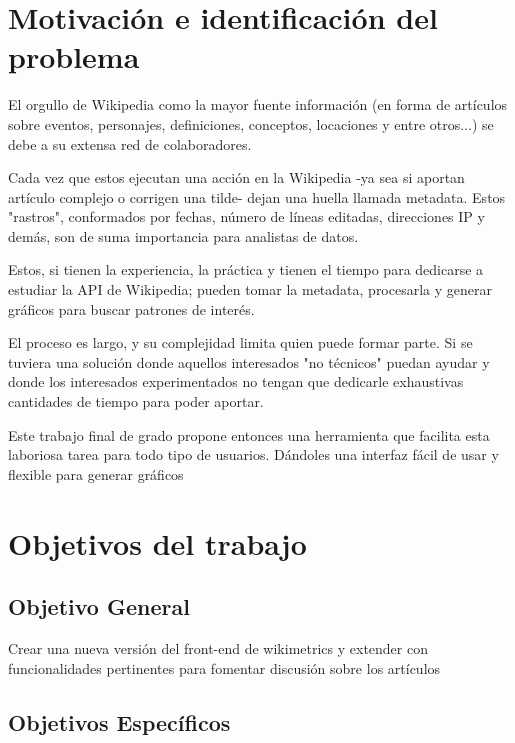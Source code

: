 

\section{Motivación e identificación del problema}

El orgullo de Wikipedia como la mayor fuente información (en forma de artículos sobre eventos, personajes, definiciones, conceptos, locaciones y entre otros...) se debe a su extensa red de colaboradores.

Cada vez que estos ejecutan una acción en la Wikipedia -ya sea si aportan artículo complejo o corrigen una tilde- dejan una huella llamada metadata. Estos "rastros", conformados por fechas, número de líneas editadas, direcciones IP y demás, son de suma importancia para analistas de datos.

Estos, si tienen la experiencia, la práctica y tienen el tiempo para dedicarse a estudiar la API de Wikipedia; pueden tomar la metadata, procesarla y generar gráficos para buscar patrones de interés. 

El proceso es largo, y su complejidad limita quien puede formar parte. Si se tuviera una solución donde aquellos interesados "no técnicos" puedan ayudar y donde los interesados experimentados no tengan que dedicarle exhaustivas cantidades de tiempo para poder aportar.

Este trabajo final de grado propone entonces una herramienta que facilita esta laboriosa tarea para todo tipo de usuarios. 
Dándoles una interfaz fácil de usar y flexible para generar gráficos 


\section{Objetivos del trabajo}


\subsection{Objetivo General}
Crear una nueva versión del front-end de wikimetrics y extender con funcionalidades pertinentes para fomentar discusión sobre los artículos

\subsection{Objetivos Específicos}

